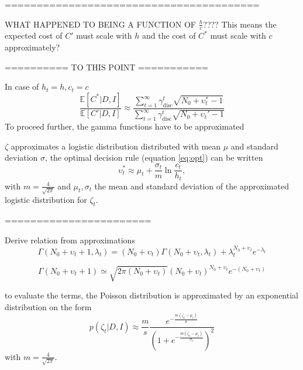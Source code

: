 ========================================


WHAT HAPPENED TO BEING A FUNCTION OF $\frac{h}{c}$???? This means the expected cost of $C'$ must scale with $h$ and the cost of $C^*$ must scale with $c$ approximately?

========== TO THIS POINT ===========

In case of $h_t=h,c_t=c$
\begin{equation}
	\frac{\mathbb{E}[C^*|D,I]}{\mathbb{E}[C'|D,I]} \approx \frac{\sum_{t=1}^{\infty}\gamma_{\text{disc}}^{t} \sqrt{N_0+\upsilon_t^*-1}}{\sum_{t=1}^{\infty}\gamma_{\text{disc}}^{t} \sqrt{N_0+\upsilon_t'-1}}
\end{equation}
To proceed further, the gamma functions have to be approximated

$\zeta$ approximates a logistic distribution distributed with mean $\mu$ and standard deviation $\sigma$, the optimal decision rule (equation \eqref{eq:opt}) can be written~\citep{bartmann1992inventory}
\begin{equation}
	\upsilon_t^* \approx \mu_t+\frac{\sigma_t}{m}\ln\frac{c_t}{h_t},
\end{equation}
with $m= \frac{4}{\sqrt{2\pi}}$ and $\mu_t,\sigma_t$ the mean and standard deviation of the approximated logistic distribution for $\zeta_t$.


=======================

Derive relation from approximations
\begin{equation}
	\Gamma(N_0+\upsilon_t+1,\lambda_t) = (N_0+\upsilon_t)\Gamma(N_0+\upsilon_t,\lambda_t)+\lambda_t^{N_0+\upsilon_t}e^{-\lambda_t}
\end{equation}

\begin{equation}
	\Gamma(N_0+\upsilon_t+1)\simeq \sqrt{2\pi (N_0+\upsilon_t)}(N_0+\upsilon_t)^{N_0+\upsilon_t}e^{-(N_0+\upsilon_t)}
\end{equation}









to evaluate the terms, the Poisson distribution is approximated by an exponential distribution on the form~\citep{}
\begin{equation}
	p(\zeta_t| D, I)\approx \frac{m}{s}\frac{e^{-\frac{m(\zeta_t-\mu_t)}{\sigma}}}{(1+e^{-\frac{m(\zeta_t-\mu_t)}{\sigma_t}})^2}
\end{equation}
with $m=\frac{4}{\sqrt{2\pi}}$.


